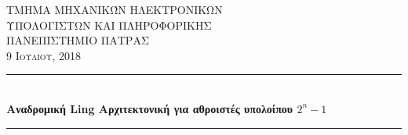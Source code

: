 
\begin{titlepage} %
	\newcommand{\HRule}{\rule{\linewidth}{0.5mm}} %
	
	\center %
	
	
	\textsc{\LARGE ΤΜΗΜΑ ΜΗΧΑΝΙΚΏΝ ΗΛΕΚΤΡΟΝΙΚΩΝ \\[0.2cm] ΥΠΟΛΟΓΙΣΤΩΝ ΚΑΙ ΠΛΗΡΟΦΟΡΙΚΗΣ}\\[1.5cm]
	\textsc{\Large ΠΑΝΕΠΙΣΤΗΜΙΟ ΠΑΤΡΑΣ}\\[0.8cm] 
	\textsc{\large 9 Ιουλιου, 2018}\\[1cm]
	
	
	\HRule\\[0.4cm]
	{\huge\bfseries Αναδρομική Ling Αρχιτεκτονική για αθροιστές υπολοίπου $2^n-1$}\\[0.4cm] 
	\HRule\\[3cm]
	


\end{titlepage}
